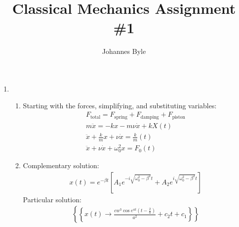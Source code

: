 \documentclass[12pt]{article}
\title{Classical Mechanics Assignment \#1}
\author{Johannes Byle}
\begin{document}
    \maketitle
    \begin{enumerate}
        \item
        \begin{enumerate}
            \item
            Starting with the forces, simplifying, and substituting variables:
            \begin{gather*}
                F_{\text{total}}=F_{\text{spring}}+F_{\text{damping}}+F_{\text{piston}}\\
                m\ddot{x}=-kx-m\nu\dot{x}+kX(t)\\
                \ddot{x}+\frac{k}{m}x+\nu\dot{x}=\frac{k}{m}(t)\\
                \ddot{x}+\nu\dot{x}+\omega_0^2 x=F_0(t)
            \end{gather*}
            \item
            Complementary solution:
            \begin{gather*}
                x(t)=e^{-\beta t}\left[A_1 e^{-i\sqrt{\omega_0^2-\beta^2}t}+A_2 e^{i\sqrt{\omega_0^2-\beta^2}t}\right]
            \end{gather*}
            Particular solution:
            \begin{gather*}
                \left\{\left\{x(t)\to \frac{c w^3 \cos  e^{a t} \left(t-\frac{2}{a}\right)}{a^2}+c_2 t+c_1\right\}\right\}
            \end{gather*}
        \end{enumerate}
    \end{enumerate}
\end{document}
